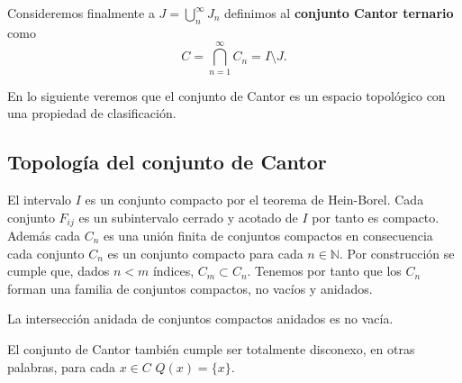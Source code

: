 Consideremos finalmente a $J=\bigcup_{n }^{\infty}  J_n$ definimos al \textbf{conjunto Cantor ternario} como $$C=\bigcap_{n=1}^\infty C_n=I \setminus J.$$ 

En lo siguiente veremos que el conjunto de Cantor es un espacio topológico con una propiedad de clasificación. 

\subsection*{Topología del conjunto de Cantor}

El intervalo $I$ es un conjunto compacto por el teorema de Hein-Borel. Cada conjunto $F_{ij}$ es un subintervalo cerrado y acotado de $I$ por tanto es compacto. Además cada $C_n$ es una unión finita de conjuntos compactos en consecuencia cada conjunto $C_n$ es un conjunto compacto para cada $n \in \mathbb{N}$. Por construcción se cumple que, dados $n < m $ índices, $C_m \subset C_n$. Tenemos por tanto que los $C_n$ forman una familia de conjuntos compactos, no vacíos y anidados. 

\begin{lm}
La intersección anidada de conjuntos compactos anidados es no vacía. 
\end{lm} 

El conjunto de Cantor también cumple ser totalmente disconexo, en otras palabras, para cada $x \in C$ $Q(x)=\{x\}$. 
 

